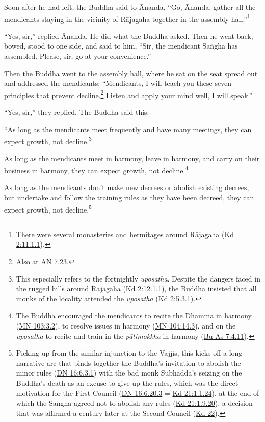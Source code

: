 \documentclass[12pt,openany]{book}%
\begin{document}
Soon after he had left, the Buddha said to Ānanda, “Go, Ānanda, gather all the mendicants staying in the vicinity of \textsanskrit{Rājagaha} together in the assembly hall.”\footnote{There were several monasteries and hermitages around \textsanskrit{Rājagaha} (\href{https://suttacentral.net/pli-tv-kd2/en/sujato\#11.1.1}{Kd 2:11.1.1}). } 

“Yes, sir,” replied Ānanda. He did what the Buddha asked. Then he went back, bowed, stood to one side, and said to him, “Sir, the mendicant \textsanskrit{Saṅgha} has assembled. Please, sir, go at your convenience.” 

Then the Buddha went to the assembly hall, where he sat on the seat spread out and addressed the mendicants: “Mendicants, I will teach you these seven principles that prevent decline.\footnote{Also at \href{https://suttacentral.net/an7.23/en/sujato}{AN 7.23}. } Listen and apply your mind well, I will speak.” 

“Yes, sir,” they replied. The Buddha said this: 

“As long as the mendicants meet frequently and have many meetings, they can expect growth, not decline.\footnote{This especially refers to the fortnightly \textit{uposatha}. Despite the dangers faced in the rugged hills around \textsanskrit{Rājagaha} (\href{https://suttacentral.net/pli-tv-kd2/en/sujato\#12.1.1}{Kd 2:12.1.1}), the Buddha insisted that all monks of the locality attended the \textit{uposatha} (\href{https://suttacentral.net/pli-tv-kd2/en/sujato\#5.3.1}{Kd 2:5.3.1}). } 

As long as the mendicants meet in harmony, leave in harmony, and carry on their business in harmony, they can expect growth, not decline.\footnote{The Buddha encouraged the mendicants to recite the Dhamma in harmony (\href{https://suttacentral.net/mn103/en/sujato\#3.2}{MN 103:3.2}), to resolve issues in harmony (\href{https://suttacentral.net/mn104/en/sujato\#14.3}{MN 104:14.3}), and on the \textit{uposatha} to recite and train in the \textit{\textsanskrit{pātimokkha}} in harmony (\href{https://suttacentral.net/pli-tv-bu-vb-as7/en/sujato\#4.11}{Bu As 7:4.11}). } 

As long as the mendicants don’t make new decrees or abolish existing decrees, but undertake and follow the training rules as they have been decreed, they can expect growth, not decline.\footnote{Picking up from the similar injunction to the Vajjis, this kicks off a long narrative arc that binds together the Buddha’s invitation to abolish the minor rules (\href{https://suttacentral.net/dn16/en/sujato\#6.3.1}{DN 16:6.3.1}) with the bad monk Subhadda’s seizing on the Buddha’s death as an excuse to give up the rules, which was the direct motivation for the First Council (\href{https://suttacentral.net/dn16/en/sujato\#6.20.3}{DN 16:6.20.3} = \href{https://suttacentral.net/pli-tv-kd21/en/sujato\#1.1.24}{Kd 21:1.1.24}), at the end of which the Sangha agreed not to abolish any rules (\href{https://suttacentral.net/pli-tv-kd21/en/sujato\#1.9.20}{Kd 21:1.9.20}), a decision that was affirmed a century later at the Second Council (\href{https://suttacentral.net/pli-tv-kd22/en/sujato}{Kd 22}). } 
\end{document}
